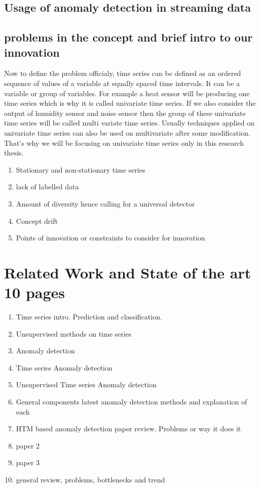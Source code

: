\documentclass[12pt]{article}
\begin{document}
\subsection{Usage of anomaly detection in streaming data}
\subsection{problems in the concept and brief intro to our innovation}
Now to define the problem officialy, time series can be defined as an ordered sequence of values of a variable at equally spaced time intervals. It can be a variable or group of variables. For example a heat sensor will be producing one time series which is why it is called univariate time series. If we also consider the output of humidity sensor and noise sensor then the group of these univariate time series will be called multi variate time series. Usually techniques applied on univariate time series can also be used on multivariate after some modification. That's why we will be focusing on univariate time series only in this research thesis. \\
\break

\begin{enumerate}
	\item Stationary and non-stationary time series
	\item lack of labelled data
	\item Amount of diversity hence calling for a universal detector
	\item Concept drift
	\item Points of innovation or constraints to consider for innovation
\end{enumerate}
\newpage
\section{Related Work and State of the art 10 pages}
\begin{enumerate}
	\item Time series intro. Prediction and classification.
	\item Unsupervised methods on time series 
	\item Anomaly detection
	\item Time series Anomaly detection
	\item Unsupervised Time series Anomaly detection
	\item General components latest anomaly detection methods and explanation of each
	\item HTM based anomaly detection paper review. Problems or way it does it
	\item paper 2
	\item paper 3
	\item general review, problems, bottlenecks and trend
\end{enumerate}
\newpage
\end{document}
